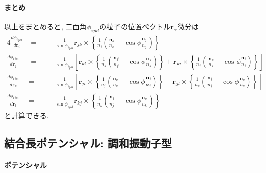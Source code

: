 \paragraph{まとめ}
以上をまとめると, 二面角$\phi_{ijkl}$の粒子の位置ベクトル$\bm{r}_{\alpha}$微分は
\begin{alignat}{4}
   \frac{d \phi_{ijkl}}{d \bm{r}_{i}}
   &=
   -&&
   \frac{1}{\sin \phi_{ijkl}}
   \bm{r}_{jk} \times
   \left\{
          \frac{1}{n_{j}}
          \left(
                 \frac{\bm{n}_{k}}{n_{k}} - \cos\phi \frac{\bm{n}_{j}}{n_{j}}
          \right)
   \right\}
   \label{Eq:dphi_dri}
   \\
   \frac{d \phi_{ijkl}}{d \bm{r}_{j}}
   &=
   -&&
   \frac{1}{\sin \phi_{ijkl}}
   \left[
      \bm{r}_{kl} \times
      \left\{
      \frac{1}{n_{k}}
             \left(
                    \frac{\bm{n}_{j}}{n_{j}} - \cos\phi \frac{\bm{n}_{k}}{n_{k}}
             \right)
      \right\}
    +
      \bm{r}_{ki} \times
      \left\{
             \frac{1}{n_{j}}
             \left(
                    \frac{\bm{n}_{k}}{n_{k}} - \cos\phi \frac{\bm{n}_{j}}{n_{j}}
             \right)
      \right\}
   \right]
   \label{Eq:dphi_drj}
   \\
   \frac{d \phi_{ijkl}}{d \bm{r}_{k}}
   &=&&
   \frac{1}{\sin \phi_{ijkl}}
   \left[
      \bm{r}_{ji} \times
      \left\{
             \frac{1}{n_{j}}
             \left(
                    \frac{\bm{n}_{k}}{n_{k}} - \cos\phi \frac{\bm{n}_{j}}{n_{j}}
             \right)
      \right\}
    +
      \bm{r}_{jl} \times
      \left\{
             \frac{1}{n_{k}}
             \left(
                    \frac{\bm{n}_{j}}{n_{j}} - \cos\phi \frac{\bm{n}_{k}}{n_{k}}
             \right)
      \right\}
   \right]
   \label{Eq:dphi_drk}
   \\
   \frac{d \phi_{ijkl}}{d \bm{r}_{l}}
   &=&&
   \frac{1}{\sin \phi_{ijkl}}
   \bm{r}_{kj} \times
   \left\{
          \frac{1}{n_{k}}
          \left(
                 \frac{\bm{n}_{j}}{n_{j}} - \cos\phi \frac{\bm{n}_{k}}{n_{k}}
          \right)
   \right\}
   \label{Eq:dphi_drl}
\end{alignat}
と計算できる. 

\clearpage
\subsection{結合長ポテンシャル: 調和振動子型}
\paragraph{ポテンシャル} \

